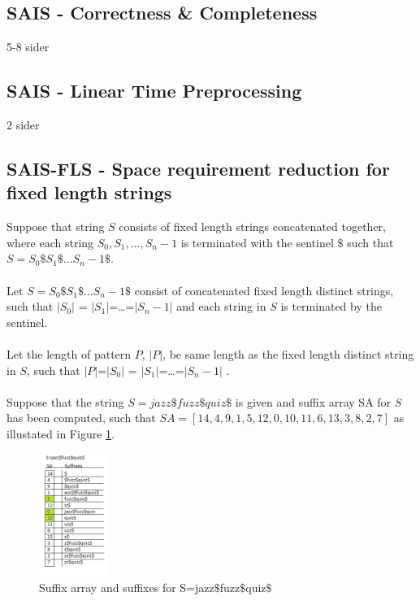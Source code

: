 \documentclass[12pt]{article} %
\begin{document}
\subsection{SAIS - Correctness \& Completeness}
5-8 sider
\subsection{SAIS - Linear Time Preprocessing}
2 sider
\subsection{SAIS-FLS - Space requirement reduction for fixed length strings}

Suppose that string $S$ consists of fixed length strings concatenated together, where each string $S_0,S_1,...,S_n-1$ is terminated with the sentinel $\$$ such that $S=S_0\$S_1\$...S_n-1\$ $.
\\ \\
Let $S=S_0\$S_1\$...S_n-1\$ $ consist of concatenated fixed length distinct strings, such that $|S_0|$ = $|S_1|$=…=$|S_n-1|$ and each string in $S$ is terminated by the sentinel.
\\ \\
Let the length of pattern $P$, $|P|$, be same length as the fixed length distinct string in $S$, such that $|P|$=$|S_0|$ = $|S_1|$=…=$|S_n-1|$ .
\\ \\
Suppose that the string $S=jazz\$fuzz\$quiz\$$  is given and suffix array SA for $S$ has been computed, such that $SA=[14,4,9,1,5,12,0,10,11,6,13,3,8,2,7]$ as illustated in Figure \ref{fig:jazz}.

\begin{figure}[H]
    \centering
    \includegraphics[width=0.2\textwidth]{jazz}
    \captionsetup{width=0.8
    \textwidth}
    \caption{Suffix array and suffixes for S=jazz$\$$fuzz$\$$quiz$\$$}
    \label{fig:jazz}
\end{figure}
\end{document}
